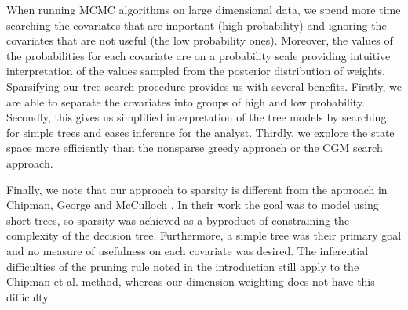  When running MCMC algorithms on large dimensional data, we spend more time searching the covariates that are important (high probability) and ignoring the covariates that are not useful (the low probability ones). Moreover, the values of the probabilities for each covariate are on a probability scale providing intuitive interpretation of the values sampled from the posterior distribution of weights.
Sparsifying our tree search procedure provides us with several benefits. Firstly, we are able to separate the covariates into groups of high and low probability. Secondly, this gives us simplified interpretation of the tree models by searching for simple trees and eases inference for the analyst. Thirdly, we explore the state space more efficiently than the nonsparse greedy approach or the CGM search approach. 

Finally, we note that our approach to sparsity is different from the approach in Chipman, George and McCulloch \cite{chipman2000hierarchical}. In their work the goal was to model using short trees, so sparsity was achieved as a byproduct of constraining the complexity of the decision tree. Furthermore, a simple tree was their primary goal and no measure of usefulness on each covariate was desired. The inferential difficulties of the pruning rule noted in the introduction still apply to the Chipman et al. \cite{chipman2000hierarchical} method, whereas our dimension weighting does not have this difficulty. 


\newpage